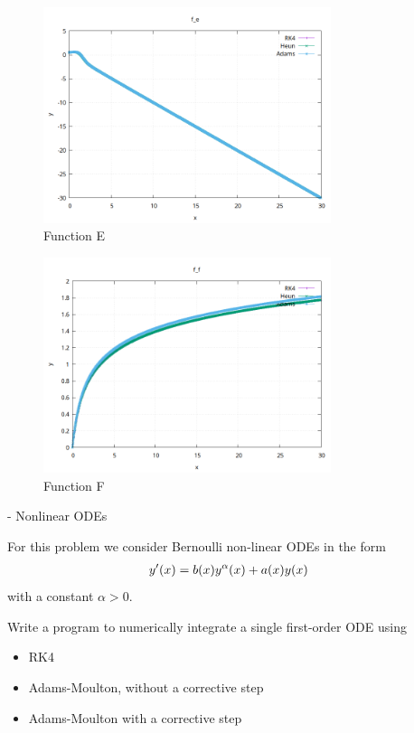 \documentclass[12pt]{article}
\newenvironment{ex}[2][Exercise]{\begin{trivlist}
\item[\hskip \labelsep {\bfseries #1}\hskip \labelsep {\bfseries #2.}]}{\end{trivlist}}
\DeclarePairedDelimiter\rb{(}{)}
\begin{document}
\begin{figure}[ht]
    \centering
    \includegraphics[width=0.75\textwidth]{./../problem2/data/f_e.png}
    \caption{Function E}
    \label{fig:fncE}
\end{figure}

\begin{figure}[ht]
    \centering
    \includegraphics[width=0.75\textwidth]{./../problem2/data/f_f.png}
    \caption{Function F}
    \label{fig:fncF}
\end{figure}

\newpage

\begin{ex}
    3 - Nonlinear ODEs
\end{ex}

For this problem we consider Bernoulli non-linear ODEs in the form
\begin{align*}
    y'\rb*{x} & =  b \rb*{x} y^{\alpha}\rb*{x} + a \rb*{x} y \rb*{x} &\\
\end{align*}
with a constant \(\alpha > 0\).

Write a program to numerically integrate a single first-order ODE using 
\begin{itemize}
    \item RK4
    \item Adams-Moulton, without a corrective step
    \item Adams-Moulton with a corrective step
\end{itemize}
\end{document}
